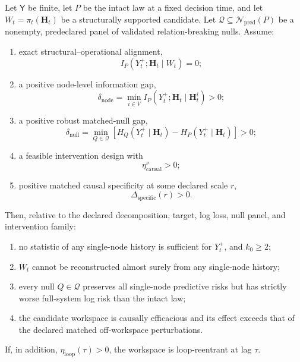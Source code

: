 \begin{theorem}
\label{thm:operational-relationality}
Let \(\mathsf Y\) be finite, let \(P\) be the intact law at a fixed decision
time, and let \(W_t=\pi_t(\mathbf H_t)\) be a structurally supported candidate.
Let
\(\mathcal Q\subseteq\mathcal N_{\mathrm{pred}}(P)\) be a nonempty,
predeclared panel of validated relation-breaking nulls. Assume:
\begin{enumerate}
\item exact structural--operational alignment,
\[
I_P(Y_t^+;\mathbf H_t\mid W_t)=0;
\]
\item a positive node-level information gap,
\[
\delta_{\mathrm{node}}
=
\min_{i\in V}
I_P(Y_t^+;\mathbf H_t\mid\mathbf H_t^i)
>0;
\]
\item a positive robust matched-null gap,
\[
\delta_{\mathrm{null}}
=
\min_{Q\in\mathcal Q}
\left[
H_Q(Y_t^+\mid\mathbf H_t)
-
H_P(Y_t^+\mid\mathbf H_t)
\right]
>0;
\]
\item a feasible intervention design with
\[
\eta_{\mathrm{causal}}^{\nu}>0;
\]
\item positive matched causal specificity at some declared scale \(r\),
\[
\Delta_{\mathrm{specific}}(r)>0.
\]
\end{enumerate}
Then, relative to the declared decomposition, target, log loss, null panel, and
intervention family:
\begin{enumerate}
\item no statistic of any single-node history is sufficient for \(Y_t^+\), and
 \(k_0\geq2\);
\item \(W_t\) cannot be reconstructed almost surely from any single-node
 history;
\item every null \(Q\in\mathcal Q\) preserves all single-node predictive
 risks but has strictly worse full-system log risk than the intact law;
\item the candidate workspace is causally efficacious and its effect exceeds
 that of the declared matched off-workspace perturbations.
\end{enumerate}
If, in addition, \(\eta_{\mathrm{loop}}(\tau)>0\), the workspace is
loop-reentrant at lag \(\tau\).
\end{theorem}

